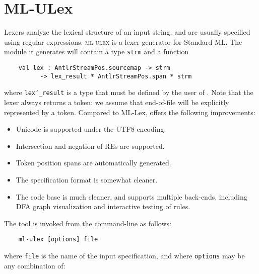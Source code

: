 %
\chapter{ML-ULex}


Lexers analyze the lexical structure of an input string, and are usually specified using regular expressions.  \textsc{ml-ulex} is a lexer generator for Standard ML.  The module it generates will contain a type {\tt strm} and a function
\begin{verbatim}
    val lex : AntlrStreamPos.sourcemap -> strm
          -> lex_result * AntlrStreamPos.span * strm
\end{verbatim}
where {\tt lex\char`\_result} is a type that must be defined by the user of \ulex{}.
Note that the lexer always returns a token: we assume that end-of-file will be explicitly represented by a token.  Compared to ML-Lex, \ulex{} offers the following improvements:
\begin{itemize}
 \item Unicode is supported under the UTF8 encoding.
 \item Intersection and negation of REs are supported.
 \item Token position spans are automatically generated.
 \item The specification format is somewhat cleaner.
 \item The code base is much cleaner, and supports multiple back-ends, including DFA graph visualization and interactive testing of rules.
\end{itemize}
The tool is invoked from the command-line as follows:
\begin{verbatim}
    ml-ulex [options] file
\end{verbatim}
where {\tt file} is the name of the input \ulex{} specification, and where {\tt options} may be any combination of:

